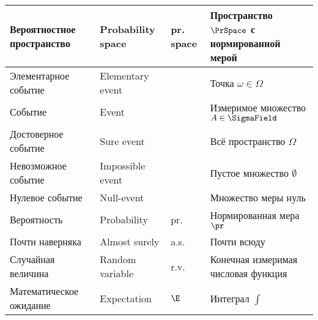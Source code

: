 \begin{tabular}{|l | l | l | p{4cm}|}
  \hline
  Вероятностное пространство  & Probability space & pr. space & Пространство $\PrSpace$ с нормированной мерой \\
  \hline
  Элементарное событие        & Elementary event  &           & Точка $\omega\in\Omega$                       \\
  \hline
  Событие                     & Event             &           & Измеримое множество $A\in\SigmaField$         \\
  \hline
  Достоверное событие         & Sure event        &           & Всё пространство $\Omega$                     \\
  \hline
  Невозможное событие         & Impossible event  &           & Пустое множество $\emptyset$                  \\
  \hline
  Нулевое событие             & Null-event        &           & Множество меры нуль                           \\
  \hline
  Вероятность                 & Probability       & pr.       & Нормированная мера $\pr$                      \\
  \hline
  Почти наверняка             & Almost surely     & a.s.      & Почти всюду                                   \\
  \hline
  Случайная величина          & Random variable   & r.v.      & Конечная измеримая числовая функция           \\
  \hline
  Математическое ожидание     & Expectation       & $\E$      & Интеграл $\int$                               \\
  \hline
\end{tabular}
